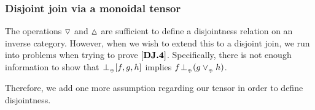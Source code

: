 
\subsubsection{Disjoint join via a monoidal tensor} %
\label{ssub:disjoint_join_via_a_monoidal_tensor}

The operations $\operatorname{\triangledown}$ and $\operatorname{\vartriangle}$ are sufficient to define a disjointness relation
on an inverse category. However, when we wish to extend this to a disjoint join, we run into
problems when trying to prove $[\text{\bfseries {DJ}.{4}}]$. Specifically, there is not enough information to
show that ${}_{{}_{}}{\perp_{{}_{\oplus}}} [f,g,h]$ implies $f {}_{{}_{}}{\perp_{{}_{\oplus}}} (g \vee_{{_{\oplus}}} h)$.

Therefore, we add one more assumption regarding our tensor in order to define disjointness.


